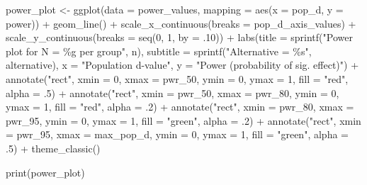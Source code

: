 \documentclass[
]{krantz}
\makeatletter
\newenvironment{Shaded}{\begin{snugshade}}{\end{snugshade}}
\newcommand{\AttributeTok}[1]{\textcolor[rgb]{0.61,0.61,0.61}{#1}}
\newcommand{\DecValTok}[1]{\textcolor[rgb]{0.06,0.06,0.06}{#1}}
\newcommand{\FunctionTok}[1]{\textcolor[rgb]{0,0,0}{#1}}
\newcommand{\NormalTok}[1]{#1}
\newcommand{\OtherTok}[1]{\textcolor[rgb]{0.37,0.37,0.37}{#1}}
\newcommand{\SpecialCharTok}[1]{\textcolor[rgb]{0,0,0}{#1}}
\newcommand{\StringTok}[1]{\textcolor[rgb]{0.5,0.5,0.5}{#1}}
\newenvironment{kframe}{%
\medskip{}
\setlength{\fboxsep}{.8em}
 \def\at@end@of@kframe{}%
 \ifinner\ifhmode%
  \def\at@end@of@kframe{\end{minipage}}%
  \begin{minipage}{\columnwidth}%
 \fi\fi%
 \def\FrameCommand##1{\hskip\@totalleftmargin \hskip-\fboxsep
 \colorbox{shadecolor}{##1}\hskip-\fboxsep
     \hskip-\linewidth \hskip-\@totalleftmargin \hskip\columnwidth}%
 \MakeFramed {\advance\hsize-\width
   \@totalleftmargin\z@ \linewidth\hsize
   \@setminipage}}%
 {\par\unskip\endMakeFramed%
 \at@end@of@kframe}
\renewenvironment{Shaded}{\begin{kframe}}{\end{kframe}}
\makeatother
\begin{document}
\begin{Shaded}
\begin{Highlighting}[]
\NormalTok{power\_plot }\OtherTok{\textless{}{-}} \FunctionTok{ggplot}\NormalTok{(}\AttributeTok{data =}\NormalTok{ power\_values,}
                     \AttributeTok{mapping =} \FunctionTok{aes}\NormalTok{(}\AttributeTok{x =}\NormalTok{ pop\_d, }\AttributeTok{y =}\NormalTok{ power)) }\SpecialCharTok{+}
  \FunctionTok{geom\_line}\NormalTok{() }\SpecialCharTok{+}
  \FunctionTok{scale\_x\_continuous}\NormalTok{(}\AttributeTok{breaks =}\NormalTok{ pop\_d\_axis\_values) }\SpecialCharTok{+}
  \FunctionTok{scale\_y\_continuous}\NormalTok{(}\AttributeTok{breaks =} \FunctionTok{seq}\NormalTok{(}\DecValTok{0}\NormalTok{, }\DecValTok{1}\NormalTok{, }\AttributeTok{by =}\NormalTok{ .}\DecValTok{10}\NormalTok{)) }\SpecialCharTok{+}
  \FunctionTok{labs}\NormalTok{(}\AttributeTok{title =} \FunctionTok{sprintf}\NormalTok{(}\StringTok{"Power plot for N = \%g per group"}\NormalTok{, n),}
       \AttributeTok{subtitle =} \FunctionTok{sprintf}\NormalTok{(}\StringTok{"Alternative = \%s"}\NormalTok{, alternative),}
       \AttributeTok{x =} \StringTok{"Population d{-}value"}\NormalTok{,}
       \AttributeTok{y =} \StringTok{"Power (probability of sig. effect)"}\NormalTok{) }\SpecialCharTok{+}
  \FunctionTok{annotate}\NormalTok{(}\StringTok{"rect"}\NormalTok{, }\AttributeTok{xmin =} \DecValTok{0}\NormalTok{, }\AttributeTok{xmax =}\NormalTok{ pwr\_50, }
           \AttributeTok{ymin =} \DecValTok{0}\NormalTok{, }\AttributeTok{ymax =} \DecValTok{1}\NormalTok{, }
           \AttributeTok{fill =} \StringTok{"red"}\NormalTok{, }\AttributeTok{alpha =}\NormalTok{ .}\DecValTok{5}\NormalTok{) }\SpecialCharTok{+}
  \FunctionTok{annotate}\NormalTok{(}\StringTok{"rect"}\NormalTok{, }\AttributeTok{xmin =}\NormalTok{ pwr\_50, }\AttributeTok{xmax =}\NormalTok{ pwr\_80, }
           \AttributeTok{ymin =} \DecValTok{0}\NormalTok{, }\AttributeTok{ymax =} \DecValTok{1}\NormalTok{, }
           \AttributeTok{fill =} \StringTok{"red"}\NormalTok{, }\AttributeTok{alpha =}\NormalTok{ .}\DecValTok{2}\NormalTok{) }\SpecialCharTok{+}
  \FunctionTok{annotate}\NormalTok{(}\StringTok{"rect"}\NormalTok{, }\AttributeTok{xmin =}\NormalTok{ pwr\_80, }\AttributeTok{xmax =}\NormalTok{ pwr\_95, }
           \AttributeTok{ymin =} \DecValTok{0}\NormalTok{, }\AttributeTok{ymax =} \DecValTok{1}\NormalTok{, }
           \AttributeTok{fill =} \StringTok{"green"}\NormalTok{, }\AttributeTok{alpha =}\NormalTok{ .}\DecValTok{2}\NormalTok{) }\SpecialCharTok{+}
  \FunctionTok{annotate}\NormalTok{(}\StringTok{"rect"}\NormalTok{, }\AttributeTok{xmin =}\NormalTok{ pwr\_95, }\AttributeTok{xmax =}\NormalTok{ max\_pop\_d, }
           \AttributeTok{ymin =} \DecValTok{0}\NormalTok{, }\AttributeTok{ymax =} \DecValTok{1}\NormalTok{, }
           \AttributeTok{fill =} \StringTok{"green"}\NormalTok{, }\AttributeTok{alpha =}\NormalTok{ .}\DecValTok{5}\NormalTok{) }\SpecialCharTok{+}
  \FunctionTok{theme\_classic}\NormalTok{()}

\FunctionTok{print}\NormalTok{(power\_plot)}
\end{Highlighting}
\end{Shaded}
\end{document}
